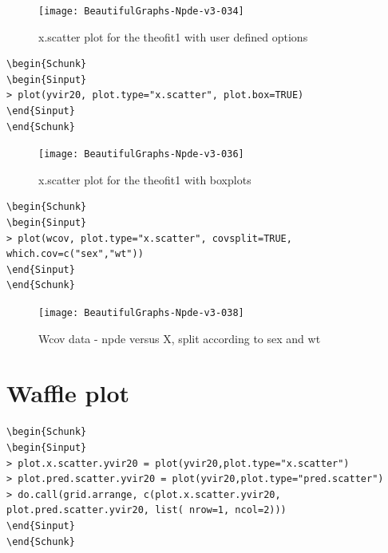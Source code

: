 \documentclass{report}
\begin{document}
\begin{figure}[H]
\caption{x.scatter plot for the theofit1 with user defined options}
\centering
\texttt{[image: BeautifulGraphs-Npde-v3-034]}
\end{figure}

\begin{lstlisting}[linerange=\\begin\{Sinput\}-\\end\{Sinput\}, includerangemarker=false]
\begin{Schunk}
\begin{Sinput}
> plot(yvir20, plot.type="x.scatter", plot.box=TRUE)
\end{Sinput}
\end{Schunk}
\end{lstlisting}


\begin{figure}[H]
\caption{x.scatter plot for the theofit1 with boxplots}
\centering
\texttt{[image: BeautifulGraphs-Npde-v3-036]}
\end{figure}

\begin{lstlisting}[linerange=\\begin\{Sinput\}-\\end\{Sinput\}, includerangemarker=false]
\begin{Schunk}
\begin{Sinput}
> plot(wcov, plot.type="x.scatter", covsplit=TRUE, which.cov=c("sex","wt"))
\end{Sinput}
\end{Schunk}
\end{lstlisting}


\begin{figure}[H]
\caption{Wcov data - npde versus X, split according to sex and wt}
\centering
\texttt{[image: BeautifulGraphs-Npde-v3-038]}
\end{figure}

\section{Waffle plot}

\begin{lstlisting}[linerange=\\begin\{Sinput\}-\\end\{Sinput\}, includerangemarker=false]
\begin{Schunk}
\begin{Sinput}
> plot.x.scatter.yvir20 = plot(yvir20,plot.type="x.scatter")
> plot.pred.scatter.yvir20 = plot(yvir20,plot.type="pred.scatter")
> do.call(grid.arrange, c(plot.x.scatter.yvir20, plot.pred.scatter.yvir20, list( nrow=1, ncol=2)))
\end{Sinput}
\end{Schunk}
\end{lstlisting}
\end{document}

